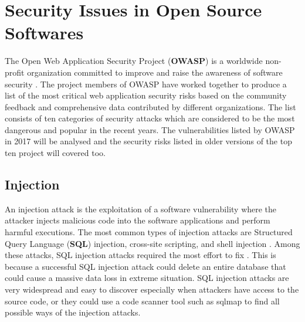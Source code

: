 \documentclass[12pt, a4paper]{report}
\begin{document}
\section{Security Issues in Open Source Softwares}
The Open Web Application Security Project (\textbf{OWASP}) is a worldwide non-profit organization
committed to improve and raise the awareness of software security \cite{owasp_home}. The project
members of OWASP have worked together to produce a list of the most critical web application
security risks based on the community feedback and comprehensive data contributed by different
organizations. The list consists of ten categories of security attacks which are considered to be
the most dangerous and popular in the recent years. The vulnerabilities listed by OWASP in 2017
\cite{owasp_top10} will be analysed and the security risks listed in older versions of the top ten
project will covered too.

\subsection{Injection}
An injection attack is the exploitation of a software vulnerability where the attacker injects
malicious code into the software applications and perform harmful executions. The most common types
of injection attacks are Structured Query Language (\textbf{SQL}) injection, cross-site scripting,
and shell injection \cite{pietraszek_2006}. Among these attacks, SQL injection attacks required the
most effort to fix \cite{othmane_2015}. This is because a successful SQL injection attack could
delete an entire database that could cause a massive data loss in extreme situation. SQL injection
attacks are very widespread and easy to discover especially when attackers have access to the source
code, or they could use a code scanner tool such as sqlmap \cite{sqlmap} to find all possible ways
of the injection attacks.
\end{document}
